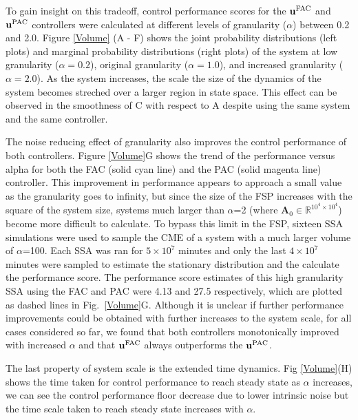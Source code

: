 \documentclass[12pt]{iopart}
\begin{document}
To gain insight on this tradeoff, control performance scores for the $\mathbf{u}^{\rm FAC}$ and $\mathbf{u}^{\rm PAC}$ controllers were calculated at different levels of granularity ($\alpha$) between 0.2 and 2.0. 
Figure \ref{Volume} (A - F) shows the joint probability distributions (left plots) and marginal probability distributions (right plots) of the system at low granularity ($\alpha=0.2$), original granularity ($\alpha=1.0$), and increased granularity ($\alpha=2.0$). As the system increases, the scale the size of the dynamics of the system becomes streched over a larger region in state space. This effect can be observed in the smoothness of C with respect to A despite using the same system and the same controller. 

The noise reducing effect of granularity also improves the control performance of both controllers. Figure \ref{Volume}G shows the trend of the performance versus alpha for both the FAC (solid cyan line) and the PAC (solid magenta line) controller. This improvement in performance appears to approach a small value as the granularity goes to infinity, but since the size of the FSP increases with the square of the system size, systems much larger than $\alpha$=2 (where $\mathbf{A}_0\in \mathbb{R}^{10^4\times10^4}$) become more difficult to calculate. 
To bypass this limit in the FSP, sixteen SSA simulations were used to sample the CME of a system with a much larger volume of $\alpha$=100. Each SSA was ran for $5\times10^7$ minutes and only the last $4\times10^7$ minutes were sampled to estimate the stationary distribution and the calculate the performance score. The performance score estimates of this high granularity SSA using the FAC and PAC were 4.13 and 27.5 respectively, which are plotted as dashed lines in Fig.\ \ref{Volume}G. Although it is unclear if further performance improvements could be obtained with further increases to the system scale, for all cases considered so far, we found that both controllers monotonically improved with increased $\alpha$ and that $\mathbf{u}^{\rm FAC}$ always outperforms the $\mathbf{u}^{\rm PAC}$. 

The last property of system scale is the extended time dynamics. Fig \ref{Volume}(H) shows the time taken for control performance to reach steady state as $\alpha$ increases, we can see the control performance floor decrease due to lower intrinsic noise but the time scale taken to reach steady state increases with $\alpha$.
\end{document}
